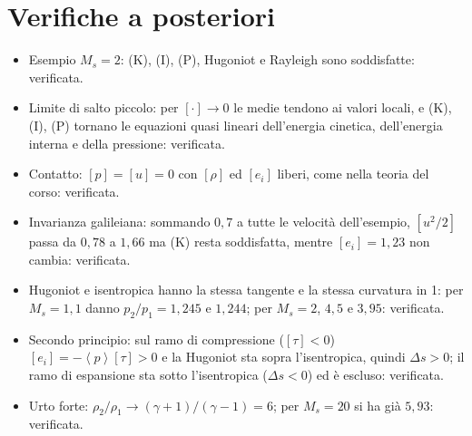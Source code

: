 \documentclass[11pt,a4paper]{article}
\newcommand{\jp}[1]{\left[#1\right]}            %
\newcommand{\av}[1]{\left\langle #1\right\rangle} %
\begin{document}
\section{Verifiche a posteriori}
\begin{itemize}
  \item Esempio $M_s=2$: (K), (I), (P), Hugoniot e Rayleigh sono soddisfatte: verificata.
  \item Limite di salto piccolo: per $\jp{\cdot}\to0$ le medie tendono ai valori locali, e (K), (I), (P)
        tornano le equazioni quasi lineari dell'energia cinetica, dell'energia interna e della pressione:
        verificata.
  \item Contatto: $\jp{p}=\jp{u}=0$ con $\jp{\rho}$ ed $\jp{e_i}$ liberi, come nella teoria del corso:
        verificata.
  \item Invarianza galileiana: sommando $0{,}7$ a tutte le velocità dell'esempio, $\jp{u^2/2}$ passa da $0{,}78$
        a $1{,}66$ ma (K) resta soddisfatta, mentre $\jp{e_i}=1{,}23$ non cambia: verificata.
  \item Hugoniot e isentropica hanno la stessa tangente e la stessa curvatura in 1: per $M_s=1{,}1$ danno
        $p_2/p_1=1{,}245$ e $1{,}244$; per $M_s=2$, $4{,}5$ e $3{,}95$: verificata.
  \item Secondo principio: sul ramo di compressione ($\jp{\tau}<0$) $\jp{e_i}=-\av{p}\jp{\tau}>0$ e la Hugoniot
        sta sopra l'isentropica, quindi $\Delta s>0$; il ramo di espansione sta sotto l'isentropica
        ($\Delta s<0$) ed è escluso: verificata.
  \item Urto forte: $\rho_2/\rho_1\to(\gamma+1)/(\gamma-1)=6$; per $M_s=20$ si ha già $5{,}93$: verificata.
\end{itemize}

\end{document}
